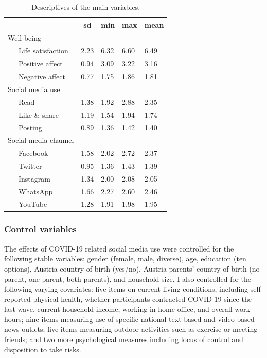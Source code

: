 \documentclass[
  man,mask,floatsintext]{apa7}
\begin{document}
\begin{table}[tbp]

\begin{center}
\begin{threeparttable}

\caption{\label{tab:tab-descriptives}Descriptives of the main variables.}

\small{

\begin{tabular}{lllll}
\toprule
 & \multicolumn{1}{c}{sd} & \multicolumn{1}{c}{min} & \multicolumn{1}{c}{max} & \multicolumn{1}{c}{mean}\\
\midrule
Well-being &  &  &  & \\
\ \ \ Life satisfaction & 2.23 & 6.32 & 6.60 & 6.49\\
\ \ \ Positive affect & 0.94 & 3.09 & 3.22 & 3.16\\
\ \ \ Negative affect & 0.77 & 1.75 & 1.86 & 1.81\\
Social media use &  &  &  & \\
\ \ \ Read & 1.38 & 1.92 & 2.88 & 2.35\\
\ \ \ Like \& share & 1.19 & 1.54 & 1.94 & 1.74\\
\ \ \ Posting & 0.89 & 1.36 & 1.42 & 1.40\\
Social media channel &  &  &  & \\
\ \ \ Facebook & 1.58 & 2.02 & 2.72 & 2.37\\
\ \ \ Twitter & 0.95 & 1.36 & 1.43 & 1.39\\
\ \ \ Instagram & 1.34 & 2.00 & 2.08 & 2.05\\
\ \ \ WhatsApp & 1.66 & 2.27 & 2.60 & 2.46\\
\ \ \ YouTube & 1.28 & 1.91 & 1.98 & 1.95\\
\bottomrule
\end{tabular}

}

\end{threeparttable}
\end{center}

\end{table}

\hypertarget{control-variables}{%
\subsubsection{Control variables}\label{control-variables}}

The effects of COVID-19 related social media use were controlled for the following stable variables:
gender (female, male, diverse), age, education (ten options), Austria country of birth (yes/no), Austria parents' country of birth (no parent, one parent, both parents), and household size.
I also controlled for the following varying covariates: five items on current living conditions, including self-reported physical health, whether participants contracted COVID-19 since the last wave, current household income, working in home-office, and overall work hours; nine items measuring use of specific national text-based and video-based news outlets; five items measuring outdoor activities such as exercise or meeting friends; and two more psychological measures including locus of control and disposition to take risks.
\end{document}
